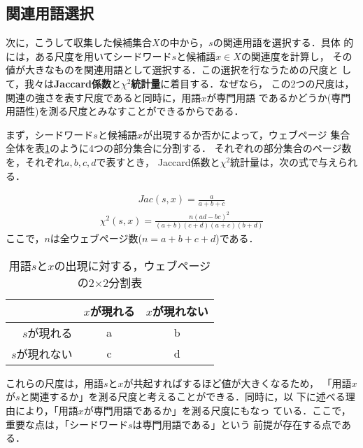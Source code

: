 \subsection{関連用語選択}\label{sec:select}

次に，こうして収集した候補集合$X$の中から，$s$の関連用語を選択する．具体
的には，ある尺度を用いてシードワード$s$と候補語$x \in X$の関連度を計算し，
その値が大きなものを関連用語として選択する．この選択を行なうための尺度と
して，我々は{\bf Jaccard係数}と{\bf $\chi^2$統計量}に着目する．なぜなら，
この2つの尺度は，関連の強さを表す尺度であると同時に，用語$x$が専門用語
であるかどうか(専門用語性)を測る尺度とみなすことができるからである．

まず，シードワード$s$と候補語$x$が出現するか否かによって，ウェブページ
集合全体を\mbox{表\ref{tbl:2by2}}のように4つの部分集合に分割する．
それぞれの部分集合のページ数を，それぞれ$a, b, c, d$で表すとき，
Jaccard係数と$\chi ^2$統計量は，次の式で与えられる．

\begin{align}
 Jac(s,x) = \frac{a}{a+b+c} \label{eq:jac}
\end{align}
\begin{align}
 \chi ^2(s,x) = \frac{n(ad-bc)^2}{(a+b)(c+d)(a+c)(b+d)} \label{eq:chi2}
\end{align}
ここで，$n$は全ウェブページ数($n=a+b+c+d$)である．

\begin{table}
 \begin{center}
  \caption{用語$s$と$x$の出現に対する，ウェブページの2$\times$2分割表}
  \label{tbl:2by2}
  \begin{tabular}{r|c|c}
   & $x$が現れる & $x$が現れない \\
   \hline
   $s$が現れる & a & b \\
   \hline
   $s$が現れない & c & d \\
  \end{tabular}
 \end{center}
\end{table}

これらの尺度は，用語$s$と$x$が共起すればするほど値が大きくなるため，
「用語$x$が$s$と関連するか」を測る尺度と考えることができる．同時に，以
下に述べる理由により，「用語$x$が専門用語であるか」を測る尺度にもなっ
ている．ここで，重要な点は，「シードワード$s$は専門用語である」という
前提が存在する点である．


